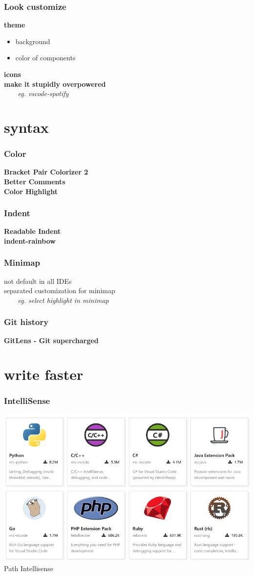 \documentclass{beamer}
\begin{document}
\begin{frame}
\frametitle{Look customize}
\textbf{theme}
\begin{itemize}
\item background
\item color of components
\end{itemize}
\textbf{icons}\\
\textbf{make it stupidly overpowered}\\
\textit{~~~~eg. vscode-spotify}
\end{frame}


\section{syntax}
\begin{frame}
\frametitle{Color}
\textbf{Bracket Pair Colorizer 2}\\
\textbf{Better Comments}\\
\textbf{Color Highlight}

\end{frame}

\begin{frame}
\frametitle{Indent}
\textbf{Readable Indent}\\
\textbf{indent-rainbow}

\end{frame}

\begin{frame}
\frametitle{Minimap}
not default in all IDEs\\
separated customization for minimap\\
\textit{~~~~eg. select highlight in minimap}
\end{frame}

\begin{frame}
\frametitle{Git history}
\textbf{GitLens - Git supercharged}
\end{frame}


\section{write faster}
\begin{frame}
\frametitle{IntelliSense}
\includegraphics[scale=0.4]{images/intelisense.png}
Path Intellisense
\end{frame}
\end{document}
